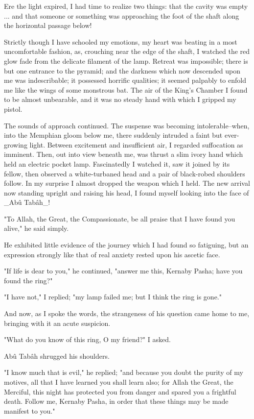 Ere the light expired, I had time to realize two things: that the
cavity was empty ... and that someone or something was approaching the
foot of the shaft along the horizontal passage below!

Strictly though I have schooled my emotions, my heart was beating in
a most uncomfortable fashion, as, crouching near the edge of the shaft,
I watched the red glow fade from the delicate filament of the lamp.
Retreat was impossible; there is but one entrance to the pyramid; and
the darkness which now descended upon me was indescribable; it
possessed horrific qualities; it seemed palpably to enfold me like the
wings of some monstrous bat. The air of the King's Chamber I found to
be almost unbearable, and it was no steady hand with which I gripped
my pistol.

The sounds of approach continued. The suspense was becoming
intolerable--when, into the Memphian gloom below me, there suddenly
intruded a faint but ever-growing light. Between excitement and
insufficient air, I regarded suffocation as imminent. Then, out into
view beneath me, was thrust a slim ivory hand which held an electric
pocket lamp. Fascinatedly I watched it, saw it joined by its fellow,
then observed a white-turbaned head and a pair of black-robed
shoulders follow. In my surprise I almost dropped the weapon which
I held. The new arrival now standing upright and raising his head,
I found myself looking into the face of _Abû Tabâh_!

"To Allah, the Great, the Compassionate, be all praise that I have
found you alive," he said simply.

He exhibited little evidence of the journey which I had found so
fatiguing, but an expression strongly like that of real anxiety rested
upon his ascetic face.

"If life is dear to you," he continued, "answer me this, Kernaby
Pasha; have you found the ring?"

"I have not," I replied; "my lamp failed me; but I think the ring is
gone."

And now, as I spoke the words, the strangeness of his question came
home to me, bringing with it an acute suspicion.

"What do you know of this ring, O my friend?" I asked.

Abû Tabâh shrugged his shoulders.

"I know much that is evil," he replied; "and because you doubt the
purity of my motives, all that I have learned you shall learn also;
for Allah the Great, the Merciful, this night has protected you from
danger and spared you a frightful death. Follow me, Kernaby Pasha,
in order that these things may be made manifest to you."


